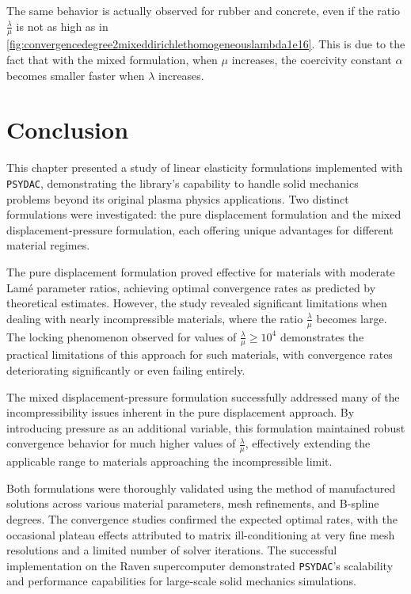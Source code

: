 \documentclass[a4paper,12pt,twoside]{report}
\begin{document}
The same behavior is actually observed for rubber and concrete, even if the ratio $\frac{\lambda}{\mu}$ is not as high as in \ref{fig:convergencedegree2mixeddirichlethomogeneouslambda1e16}. This is due to the fact that with the mixed formulation, when $\mu$ increases, the coercivity constant $\alpha$ becomes smaller faster when $\lambda$ increases.

\section{Conclusion}

This chapter presented a study of linear elasticity formulations implemented with \texttt{PSYDAC}, demonstrating the library's capability to handle solid mechanics problems beyond its original plasma physics applications. Two distinct formulations were investigated: the pure displacement formulation and the mixed displacement-pressure formulation, each offering unique advantages for different material regimes.

The pure displacement formulation proved effective for materials with moderate Lamé parameter ratios, achieving optimal convergence rates as predicted by theoretical estimates. However, the study revealed significant limitations when dealing with nearly incompressible materials, where the ratio $\frac{\lambda}{\mu}$ becomes large. The locking phenomenon observed for values of $\frac{\lambda}{\mu} \geq 10^4$ demonstrates the practical limitations of this approach for such materials, with convergence rates deteriorating significantly or even failing entirely.

The mixed displacement-pressure formulation successfully addressed many of the incompressibility issues inherent in the pure displacement approach. By introducing pressure as an additional variable, this formulation maintained robust convergence behavior for much higher values of $\frac{\lambda}{\mu}$, effectively extending the applicable range to materials approaching the incompressible limit. 

Both formulations were thoroughly validated using the method of manufactured solutions across various material parameters, mesh refinements, and B-spline degrees. The convergence studies confirmed the expected optimal rates, with the occasional plateau effects attributed to matrix ill-conditioning at very fine mesh resolutions and a limited number of solver iterations. The successful implementation on the Raven supercomputer demonstrated \texttt{PSYDAC}'s scalability and performance capabilities for large-scale solid mechanics simulations.
\end{document}
